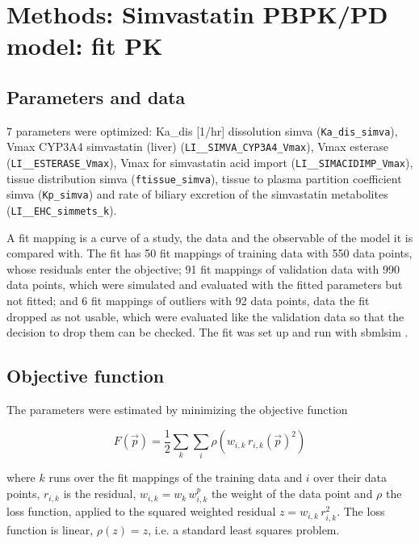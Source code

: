 \section{Methods: Simvastatin PBPK/PD model: fit PK}

\subsection{Parameters and data}

7 parameters were optimized: Ka\_dis [1/hr] dissolution simva (\texttt{Ka\_dis\_simva}), Vmax CYP3A4 simvastatin (liver) (\texttt{LI\_\_SIMVA\_CYP3A4\_Vmax}), Vmax esterase (\texttt{LI\_\_ESTERASE\_Vmax}), Vmax for simvastatin acid import (\texttt{LI\_\_SIMACIDIMP\_Vmax}), tissue distribution simva (\texttt{ftissue\_simva}), tissue to plasma partition coefficient simva (\texttt{Kp\_simva}) and rate of biliary excretion of the simvastatin metabolites (\texttt{LI\_\_EHC\_simmets\_k}).

A fit mapping is a curve of a study, the data and the observable of the model it is compared with. The fit has 50 fit mappings of training data with 550 data points, whose residuals enter the objective; 91 fit mappings of validation data with 990 data points, which were simulated and evaluated with the fitted parameters but not fitted; and 6 fit mappings of outliers with 92 data points, data the fit dropped as not usable, which were evaluated like the validation data so that the decision to drop them can be checked. The fit was set up and run with sbmlsim \cite{Koenig2026_sbmlsim}.

\subsection{Objective function}

The parameters were estimated by minimizing the objective function

\begin{equation}
F(\vec{p}) = \frac{1}{2} \sum_{k} \sum_{i} \rho\left(w_{i,k}\, r_{i,k}(\vec{p})^2\right)
\end{equation}

where $k$ runs over the fit mappings of the training data and $i$ over their data points, $r_{i,k}$ is the residual, $w_{i,k} = w_k\, w^{p}_{i,k}$ the weight of the data point and $\rho$ the loss function, applied to the squared weighted residual $z = w_{i,k}\, r_{i,k}^2$. The loss function is linear, $\rho(z) = z$, i.e. a standard least squares problem.

